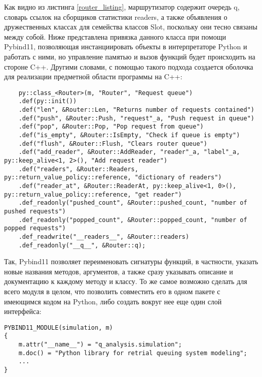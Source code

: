 Как видно из листинга \ref{router_listing}, маршрутизатор содержит очередь q, словарь ссылок на сборщиков статистики readers, а также объявления о дружественных классах для семейства классов Slot, поскольку они тесно связаны между собой. Ниже представлена привязка данного класса при помощи Pybind11, позволяющая инстанциировать объекты в интерпретаторе Python и работать с ними, но управление памятью и вызов функций будет происходить на стороне C++. Другими словами, с помощью такого подхода создается оболочка для реализации предметной области программы на C++:

\begin{lstlisting}
	py::class_<Router>(m, "Router", "Request queue")
	.def(py::init())
	.def("len", &Router::Len, "Returns number of requests contained")
	.def("push", &Router::Push, "request"_a, "Push request in queue")
	.def("pop", &Router::Pop, "Pop request from queue")
	.def("is_empty", &Router::IsEmpty, "Check if queue is empty")
	.def("flush", &Router::Flush, "Clears router queue")
	.def("add_reader", &Router::AddReader, "reader"_a, "label"_a, py::keep_alive<1, 2>(), "Add request reader")
	.def("readers", &Router::Readers, py::return_value_policy::reference, "dictionary of readers")
	.def("reader_at", &Router::ReaderAt, py::keep_alive<1, 0>(), py::return_value_policy::reference, "get reader")
	.def_readonly("pushed_count", &Router::pushed_count, "number of pushed requests")
	.def_readonly("popped_count", &Router::popped_count, "number of popped requests")
	.def_readwrite("__readers__", &Router::readers)
	.def_readonly("__q__", &Router::q);
\end{lstlisting}

Так, Pybind11 позволяет переименовать сигнатуры функций, в частности, указать новые названия методов, аргументов, а также сразу указывать описание и документацию к каждому методу и классу. То же самое возможно сделать для всего модуля в целом, что позволить совместить его в одном пакете с имеющимся кодом на Python, либо создать вокруг нее еще один слой интерфейса:
\begin{lstlisting}
PYBIND11_MODULE(simulation, m)
{
	m.attr("__name__") = "q_analysis.simulation";
	m.doc() = "Python library for retrial queuing system modeling";
	...
}
\end{lstlisting}

